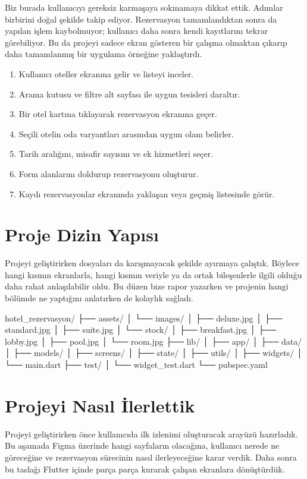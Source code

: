 \documentclass[11pt,a4paper]{article}
\begin{document}
Biz burada kullanıcıyı gereksiz karmaşaya sokmamaya dikkat ettik. Adımlar birbirini doğal şekilde takip ediyor. Rezervasyon tamamlandıktan sonra da yapılan işlem kaybolmuyor; kullanıcı daha sonra kendi kayıtlarını tekrar görebiliyor. Bu da projeyi sadece ekran gösteren bir çalışma olmaktan çıkarıp daha tamamlanmış bir uygulama örneğine yaklaştırdı.

\begin{enumerate}
\item Kullanıcı oteller ekranına gelir ve listeyi inceler.
\item Arama kutusu ve filtre alt sayfası ile uygun tesisleri daraltır.
\item Bir otel kartına tıklayarak rezervasyon ekranına geçer.
\item Seçili otelin oda varyantları arasından uygun olanı belirler.
\item Tarih aralığını, misafir sayısını ve ek hizmetleri seçer.
\item Form alanlarını doldurup rezervasyonu oluşturur.
\item Kaydı rezervasyonlar ekranında yaklaşan veya geçmiş listesinde görür.
\end{enumerate}

\section{Proje Dizin Yapısı}
Projeyi geliştirirken dosyaları da karışmayacak şekilde ayırmaya çalıştık. Böylece hangi kısmın ekranlarla, hangi kısmın veriyle ya da ortak bileşenlerle ilgili olduğu daha rahat anlaşılabilir oldu. Bu düzen bize rapor yazarken ve projenin hangi bölümde ne yaptığını anlatırken de kolaylık sağladı.

\begin{codeblock}
hotel_rezervasyon/
├── assets/
│   └── images/
│       ├── deluxe.jpg
│       ├── standard.jpg
│       ├── suite.jpg
│       └── stock/
│           ├── breakfast.jpg
│           ├── lobby.jpg
│           ├── pool.jpg
│           └── room.jpg
├── lib/
│   ├── app/
│   ├── data/
│   ├── models/
│   ├── screens/
│   ├── state/
│   ├── utils/
│   ├── widgets/
│   └── main.dart
├── test/
│   └── widget_test.dart
└── pubspec.yaml
\end{codeblock}

\section{Projeyi Nasıl İlerlettik}
Projeyi geliştirirken önce kullanıcıda ilk izlenimi oluşturacak arayüzü hazırladık. Bu aşamada Figma üzerinde hangi sayfaların olacağına, kullanıcı nerede ne göreceğine ve rezervasyon sürecinin nasıl ilerleyeceğine karar verdik. Daha sonra bu taslağı Flutter içinde parça parça kurarak çalışan ekranlara dönüştürdük.
\end{document}

